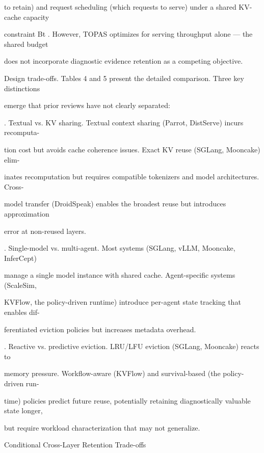 \begin{flushleft}
\noindent to retain) and request scheduling (which requests to serve) under a shared KV-cache capacity\par
\noindent constraint Bt . However, TOPAS optimizes for serving throughput alone — the shared budget\par
\noindent does not incorporate diagnostic evidence retention as a competing objective.\par
\par\smallskip
\noindent Design trade-offs. Tables 4 and 5 present the detailed comparison. Three key distinctions\par
\noindent emerge that prior reviews have not clearly separated:\par
{}. Textual vs. KV sharing. Textual context sharing (Parrot, DistServe) incurs recomputa-\par
\noindent  tion cost but avoids cache coherence issues. Exact KV reuse (SGLang, Mooncake) elim-\par
\noindent  inates recomputation but requires compatible tokenizers and model architectures. Cross-\par
\noindent  model transfer (DroidSpeak) enables the broadest reuse but introduces approximation\par
\noindent  error at non-reused layers.\par
{}. Single-model vs. multi-agent. Most systems (SGLang, vLLM, Mooncake, InferCept)\par
\noindent  manage a single model instance with shared cache. Agent-specific systems (ScaleSim,\par
\noindent  KVFlow, the policy-driven runtime) introduce per-agent state tracking that enables dif-\par
\noindent  ferentiated eviction policies but increases metadata overhead.\par
{}. Reactive vs. predictive eviction. LRU/LFU eviction (SGLang, Mooncake) reacts to\par
\noindent  memory pressure. Workflow-aware (KVFlow) and survival-based (the policy-driven run-\par
\noindent  time) policies predict future reuse, potentially retaining diagnostically valuable state longer,\par
\noindent  but require workload characterization that may not generalize.\par
\par\smallskip
\par\smallskip
{} Conditional Cross-Layer Retention Trade-offs\par

\end{flushleft}
